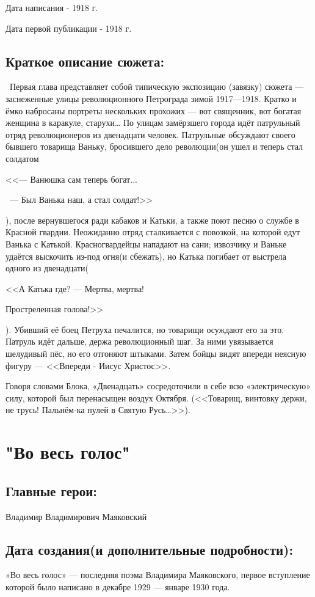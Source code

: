\documentclass[a4paper,12pt]{article}
\begin{document}
	\noindent
	Дата написания - 1918 г.
	
	\noindent
	Дата первой публикации - 1918 г.
	
	\subsection{Краткое описание сюжета: }
	\quad \, Первая глава представляет собой типическую экспозицию (завязку) сюжета — заснеженные улицы революционного Петрограда зимой 1917—1918. Кратко и ёмко набросаны портреты нескольких прохожих — вот священник, вот богатая женщина в каракуле, старухи… По улицам замёрзшего города идёт патрульный отряд революционеров из двенадцати человек. Патрульные обсуждают своего бывшего товарища Ваньку, бросившего дело революции(он ушел и теперь стал солдатом
	
	<<— Ванюшка сам теперь богат...
	
	\, — Был Ванька наш, а стал солдат!>>
	
	\noindent
	), после вернувшегося ради кабаков и Катьки, а также поют песню о службе в Красной гвардии. Неожиданно отряд сталкивается с повозкой, на которой едут Ванька с Катькой. Красногвардейцы нападают на сани; извозчику и Ваньке удаётся выскочить из-под огня(и сбежать), но Катька погибает от выстрела одного из двенадцати(
	
	<<А Катька где? — Мертва, мертва!
	
	\quad  \quad \quad Простреленная голова!>>
	
	\noindent
	). Убивший её боец Петруха печалится, но товарищи осуждают его за это. Патруль идёт дальше, держа революционный шаг. За ними увязывается шелудивый пёс, но его отгоняют штыками. Затем бойцы видят впереди неясную фигуру — <<Впереди - Иисус Христос>>.
	
	Говоря словами Блока, «Двенадцать» сосредоточили в себе всю «электрическую» силу, которой был перенасыщен воздух Октября. (<<Товарищ, винтовку держи, не трусь! Пальнём-ка пулей в Святую Русь…>>).
	
	\section{"Во весь голос"}
	\subsection{Главные герои: }
	Владимир Владимирович Маяковский
	\subsection{Дата создания(и дополнительные подробности): }
	»Во весь голос» — последняя поэма Владимира Маяковского, первое вступление которой было написано в декабре 1929 — январе 1930 года.
	
\end{document}
